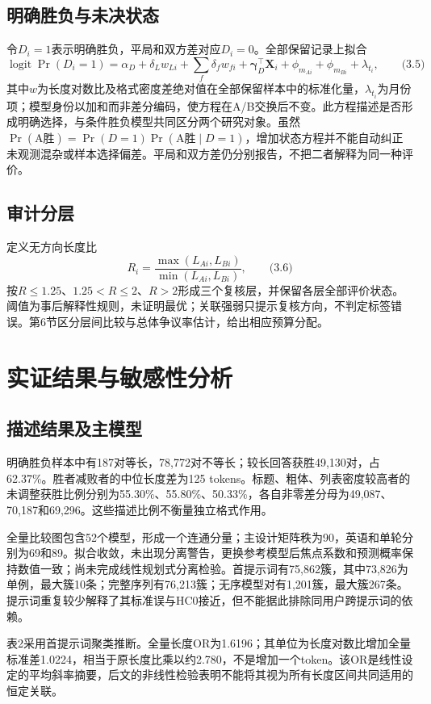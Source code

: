 \documentclass[UTF8,11pt,a4paper,fontset=windows]{ctexart}
\numberwithin{equation}{section}
\begin{document}
\subsection{明确胜负与未决状态}
令$D_i=1$表示明确胜负，平局和双方差对应$D_i=0$。全部保留记录上拟合
\[\operatorname{logit}\Pr(D_i=1)=\alpha_D+\delta_Lw_{Li}
 +\sum_f\delta_fw_{fi}+\bm\gamma_D^\top\bm X_i
 +\phi_{m_{Ai}}+\phi_{m_{Bi}}+\lambda_{t_i},\qquad\text{(3.5)}\]
其中$w$为长度对数比及格式密度差绝对值在全部保留样本中的标准化量，$\lambda_{t_i}$为月份项；模型身份以加和而非差分编码，使方程在A/B交换后不变。此方程描述是否形成明确选择，与条件胜负模型共同区分两个研究对象。虽然$\Pr(\text{A胜})=\Pr(D=1)\Pr(\text{A胜}\mid D=1)$，增加状态方程并不能自动纠正未观测混杂或样本选择偏差。平局和双方差仍分别报告，不把二者解释为同一种评价。

\subsection{审计分层}
定义无方向长度比
\[R_i=\frac{\max(L_{Ai},L_{Bi})}{\min(L_{Ai},L_{Bi})},\qquad\text{(3.6)}\]
按$R\leq1.25$、$1.25<R\leq2$、$R>2$形成三个复核层，并保留各层全部评价状态。阈值为事后解释性规则，未证明最优；关联强弱只提示复核方向，不判定标签错误。第6节区分层间比较与总体争议率估计，给出相应预算分配。
\section{实证结果与敏感性分析}
\subsection{描述结果及主模型}
明确胜负样本中有187对等长，78,772对不等长；较长回答获胜49,130对，占62.37\%。胜者减败者的中位长度差为125 tokens。标题、粗体、列表密度较高者的未调整获胜比例分别为55.30\%、55.80\%、50.33\%，各自非零差分母为49,087、70,187和69,296。这些描述比例不衡量独立格式作用。

全量比较图包含52个模型，形成一个连通分量；主设计矩阵秩为90，英语和单轮分别为69和89。拟合收敛，未出现分离警告，更换参考模型后焦点系数和预测概率保持数值一致；尚未完成线性规划式分离检验。首提示词有75,862簇，其中73,826为单例，最大簇10条；完整序列有76,213簇；无序模型对有1,201簇，最大簇267条。提示词重复较少解释了其标准误与HC0接近，但不能据此排除同用户跨提示词的依赖。

表2采用首提示词聚类推断。全量长度OR为1.6196；其单位为长度对数比增加全量标准差1.0224，相当于原长度比乘以约2.780，不是增加一个token。该OR是线性设定的平均斜率摘要，后文的非线性检验表明不能将其视为所有长度区间共同适用的恒定关联。
\end{document}
